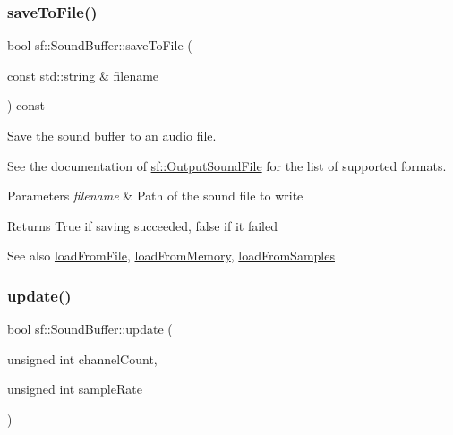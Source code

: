 \subsubsection{\texorpdfstring{saveToFile()}{saveToFile()}}
{\footnotesize\ttfamily bool sf\+::\+Sound\+Buffer\+::save\+To\+File (\begin{DoxyParamCaption}\item[{const std\+::string \&}]{filename }\end{DoxyParamCaption}) const}



Save the sound buffer to an audio file. 

See the documentation of \mbox{\hyperlink{classsf_1_1_output_sound_file}{sf\+::\+Output\+Sound\+File}} for the list of supported formats.


\begin{DoxyParams}{Parameters}
{\em filename} & Path of the sound file to write\\
\hline
\end{DoxyParams}
\begin{DoxyReturn}{Returns}
True if saving succeeded, false if it failed
\end{DoxyReturn}
\begin{DoxySeeAlso}{See also}
\mbox{\hyperlink{classsf_1_1_sound_buffer_a2be6a8025c97eb622a7dff6cf2594394}{load\+From\+File}}, \mbox{\hyperlink{classsf_1_1_sound_buffer_af8cfa5599739a7edae69c5cba273d33f}{load\+From\+Memory}}, \mbox{\hyperlink{classsf_1_1_sound_buffer_a42d51ce4bb3b60c7ea06f63c273fd063}{load\+From\+Samples}} \begin{DoxyVerb}\end{DoxyVerb}
 
\end{DoxySeeAlso}
\mbox{\label{classsf_1_1_sound_buffer_afaa542a4b59ac4e8c4f4d163ea61c7e6}} 
\subsubsection{\texorpdfstring{update()}{update()}}
{\footnotesize\ttfamily bool sf\+::\+Sound\+Buffer\+::update (\begin{DoxyParamCaption}\item[{unsigned int}]{channel\+Count,  }\item[{unsigned int}]{sample\+Rate }\end{DoxyParamCaption})\hspace{0.3cm}{\ttfamily [private]}}



